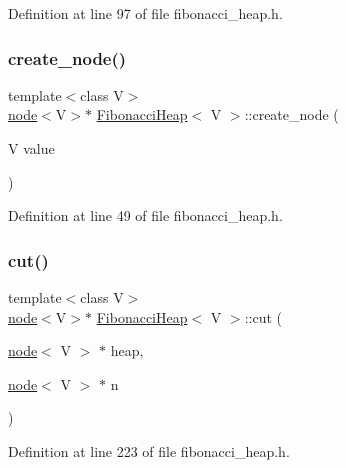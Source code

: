 Definition at line 97 of file fibonacci\+\_\+heap.\+h.

\mbox{\label{class_fibonacci_heap_a2de69d27315f0f4cd6c2375a485c6ef5}} 
\subsubsection{\texorpdfstring{create\+\_\+node()}{create\_node()}}
{\footnotesize\ttfamily template$<$class V$>$ \\
\hyperlink{structnode}{node}$<$V$>$$\ast$ \hyperlink{class_fibonacci_heap}{Fibonacci\+Heap}$<$ V $>$\+::create\+\_\+node (\begin{DoxyParamCaption}\item[{V}]{value }\end{DoxyParamCaption})\hspace{0.3cm}{\ttfamily [inline]}}



Definition at line 49 of file fibonacci\+\_\+heap.\+h.

\mbox{\label{class_fibonacci_heap_a6777625b9569bd48fcefa848d7a8812a}} 
\subsubsection{\texorpdfstring{cut()}{cut()}}
{\footnotesize\ttfamily template$<$class V$>$ \\
\hyperlink{structnode}{node}$<$V$>$$\ast$ \hyperlink{class_fibonacci_heap}{Fibonacci\+Heap}$<$ V $>$\+::cut (\begin{DoxyParamCaption}\item[{\hyperlink{structnode}{node}$<$ V $>$ $\ast$}]{heap,  }\item[{\hyperlink{structnode}{node}$<$ V $>$ $\ast$}]{n }\end{DoxyParamCaption})\hspace{0.3cm}{\ttfamily [inline]}}



Definition at line 223 of file fibonacci\+\_\+heap.\+h.

\mbox{\label{class_fibonacci_heap_a36e1518c83aa296c0c8b9a6e4cfb42d6}} 
